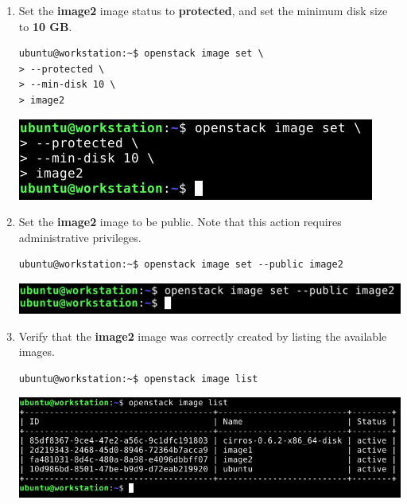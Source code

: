 \documentclass[letterpaper, 12pt]{article}
\begin{document}
\begin{enumerate}
    \item Set the \textbf{image2} image status to \textbf{protected}, and set the minimum disk size to \textbf{10 GB}.
\begin{lstlisting}
ubuntu@workstation:~$ openstack image set \
> --protected \
> --min-disk 10 \
> image2
\end{lstlisting}

    \begin{center}
        \includegraphics[width=\linewidth]{images/part1/step12.png}
    \end{center}

    \item Set the \textbf{image2} image to be public. Note that this action requires administrative privileges.
\begin{lstlisting}
ubuntu@workstation:~$ openstack image set --public image2
\end{lstlisting}

    \begin{center}
        \includegraphics[width=\linewidth]{images/part1/step13.png}
    \end{center}

    \item Verify that the \textbf{image2} image was correctly created by listing the available images.
\begin{lstlisting}
ubuntu@workstation:~$ openstack image list
\end{lstlisting}

    \begin{center}
        \includegraphics[width=\linewidth]{images/part1/step14.png}
    \end{center}


\end{enumerate}
\end{document}
